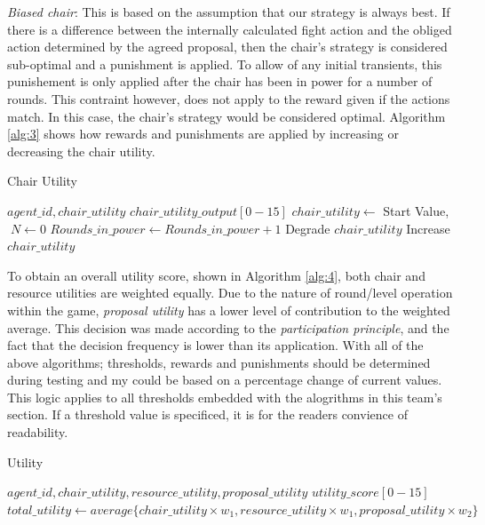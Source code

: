 \textit{Biased chair}: This is based on the assumption that our strategy is always best. If there is a difference between the internally calculated fight action and the obliged action determined by the agreed proposal, then the chair's strategy is considered sub-optimal and a punishment is applied. To allow of any initial transients, this punishement is only applied after the chair has been in power for a number of rounds. This contraint however, does not apply to the reward given if the actions match. In this case, the chair's strategy would be considered optimal. Algorithm \ref{alg:3} shows how rewards and punishments are applied by increasing or decreasing the chair utility. 

\begin{algorithm}[htb]
\caption{Chair Utility}\label{alg:3}
\begin{algorithmic} 
\scriptsize
\Require $agent\_id, chair\_utility$
\Ensure $chair\_utility\_output[0-15]$
\State $chair\_utility \leftarrow$ Start Value, $\; N \leftarrow 0$
\EndIf
{}
\State $Rounds\_in\_power \leftarrow Rounds\_in\_power+1$
\State Degrade $chair\_utility$
\EndIf
\EndIf
{}
\State Increase $chair\_utility$
\EndIf
\end{algorithmic}
\end{algorithm}

To obtain an overall utility score, shown in Algorithm \ref{alg:4}, both chair and resource utilities are weighted equally. Due to the nature of round/level operation within the game, \textit{proposal utility} has a lower level of contribution to the weighted average. This decision was made according to the \textit{participation principle}, and the fact that the decision frequency is lower than its application. With all of the above algorithms; thresholds, rewards and punishments should be determined during testing and my could be based on a percentage change of current values. This logic applies to all thresholds embedded with the alogrithms in this team's section. If a threshold value is specificed, it is for the readers convience of readability.                    


\begin{algorithm}[htb]
\caption{Utility}\label{alg:4}
\begin{algorithmic} 
\scriptsize
\Require $agent\_id, chair\_utility, resource\_utility, proposal\_utility$
\Ensure $utility\_score[0-15]$
\State $total\_utility \leftarrow average\{chair\_utility \times w_1, resource\_utility \times w_1, proposal\_utility \times w_2\}$
\EndIf
\end{algorithmic}
\end{algorithm}



